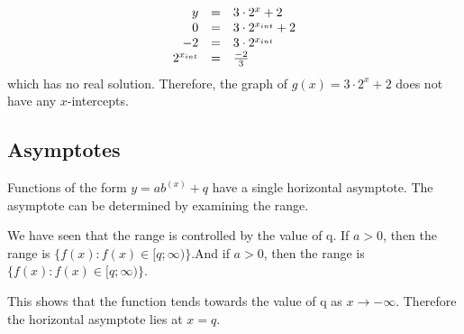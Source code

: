 \nopagebreak\noindent{}
\begin{equation*}
\begin{array}{ccc}\hfill y& =& 3\ensuremath{\cdot}{2}^{x}+2\hfill \\ \hfill 0& =& 3\ensuremath{\cdot}{2}^{{x}_{int}}+2\hfill \\ \hfill -2& =& 3\ensuremath{\cdot}{2}^{{x}_{int}}\hfill \\ \hfill {2}^{{x}_{int}}& =& \frac{-2}{3}\hfill \end{array}
\end{equation*}
which has no real solution. Therefore, the graph of $g(x)=3\ensuremath{\cdot}{2}^{x}+2$ does not have any $x$-intercepts.\par 

\subsection*{Asymptotes}
\nopagebreak
Functions of the form $y=a{b}^{(x)}+q$ have a single horizontal asymptote. The asymptote can be determined by examining the range.\par 
We have seen that the range is controlled by the value of q. If $a>0$, then the range is $\{f(x):f(x)\in [q;\infty )\}$.And if $a>0$, then the range is $\{f(x):f(x)\in [q;\infty )\}$.\par 
This shows that the function tends towards the value of q as $x\to -\infty $. Therefore the horizontal asymptote lies at $x=q$.
\par 

